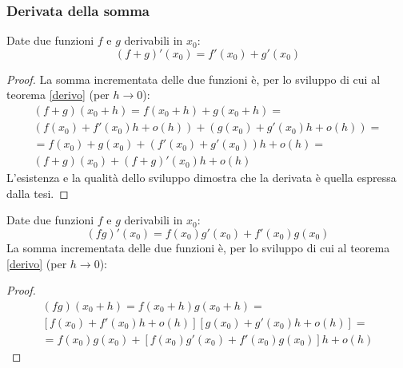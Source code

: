\subsubsection{Derivata della somma}
\begin{prop}
	Date due funzioni $f$ e $g$ derivabili in $x_0$:
	\[
		(f+g)'(x_0)=f'(x_0)+g'(x_0)
	\]
\end{prop}
\begin{proof}
	La somma incrementata delle due funzioni è, per lo sviluppo di cui al teorema \ref{derivo} (per $h\to0$):
	\begin{gather*}
		(f+g)(x_0+h)=f(x_0+h)+g(x_0+h)=\\
		(f(x_0)+f'(x_0)h+o(h))+(g(x_0)+g'(x_0)h+o(h))=\\
		=f(x_0)+g(x_0)+(f'(x_0)+g'(x_0))h+o(h)=\\
		(f+g)(x_0)+(f+g)'(x_0)h+o(h)
	\end{gather*}
	L'esistenza e la qualità dello sviluppo dimostra che la derivata è quella espressa dalla tesi.
\end{proof}
\begin{prop}
	\label{der:prod}
	Date due funzioni $f$ e $g$ derivabili in $x_0$:
	\[
		(fg)'(x_0)=f(x_0)g'(x_0)+f'(x_0)g(x_0)
	\]
	La somma incrementata delle due funzioni è, per lo sviluppo di cui al teorema \ref{derivo} (per $h\to0$):
\end{prop}
\begin{proof}
	\begin{gather*}
		(fg)(x_0+h)=f(x_0+h)g(x_0+h)=\\
		[f(x_0)+f'(x_0)h+o(h)][g(x_0)+g'(x_0)h+o(h)]=\\
		=f(x_0)g(x_0)+[f(x_0)g'(x_0)+f'(x_0)g(x_0)]h+o(h)
	\end{gather*}
\end{proof}

